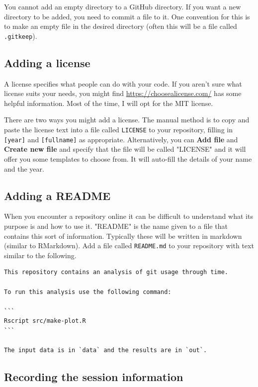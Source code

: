 \documentclass[11pt,onecolumn]{scrartcl}
\begin{document}
You cannot add an empty directory to a GitHub directory. If you want a new
directory to be added, you need to commit a file to it. One convention for this
is to make an empty file in the desired directory (often this will be a file
called \texttt{.gitkeep}).

\subsection{Adding a license}
\label{sec:org49ab1a6}

A license specifies what people can do with your code. If you aren't sure what
license suits your needs, you might find \url{https://choosealicense.com/} has some
helpful information. Most of the time, I will opt for the MIT license.

There are two ways you might add a license. The manual method is to copy and
paste the license text into a file called \texttt{LICENSE} to your repository, filling in
\texttt{[year]} and \texttt{[fullname]} as appropriate. Alternatively, you can \textbf{Add file} and \textbf{Create
new file} and specify that the file will be called "LICENSE" and it will offer
you some templates to choose from. It will auto-fill the details of your name
and the year.

\subsection{Adding a README}
\label{sec:orgc298b6e}

When you encounter a repository online it can be difficult to understand what
its purpose is and how to use it. "README" is the name given to a file that
contains this sort of information. Typically these will be written in markdown
(similar to RMarkdown). Add a file called \texttt{README.md} to your repository with text
similar to the following.

\lstset{language=sh,label= ,caption= ,captionpos=b,numbers=none}
\begin{lstlisting}
This repository contains an analysis of git usage through time.

To run this analysis use the following command:

```
Rscript src/make-plot.R
```

The input data is in `data` and the results are in `out`.
\end{lstlisting}

\subsection{Recording the session information}
\label{sec:org53251f3}
\end{document}
